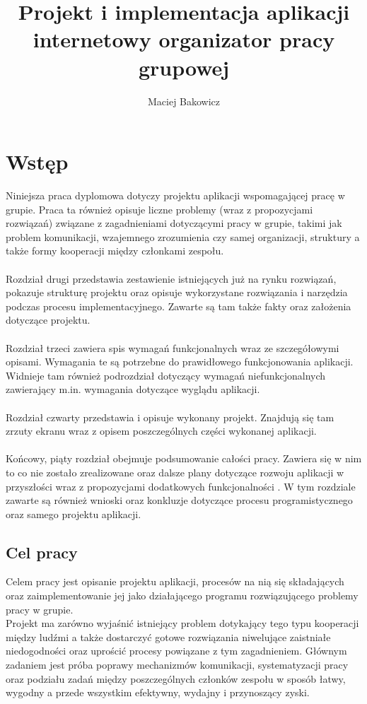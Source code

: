 \documentclass[eng,printmode]{mgr}
\title{Projekt i implementacja aplikacji internetowy organizator pracy grupowej }
\author{Maciej Bakowicz}
\begin{document}


\maketitle 

\tableofcontents 

\chapter{Wstęp}  
Niniejsza praca dyplomowa dotyczy projektu aplikacji wspomagającej pracę w grupie. Praca ta również opisuje liczne problemy (wraz z  propozycjami rozwiązań) związane z zagadnieniami dotyczącymi pracy w grupie, takimi jak problem komunikacji, wzajemnego zrozumienia czy samej organizacji, struktury a także formy kooperacji między członkami zespołu.
\\ \\
Rozdział drugi przedstawia zestawienie istniejących już na rynku rozwiązań, pokazuje strukturę projektu oraz opisuje wykorzystane rozwiązania i narzędzia podczas procesu implementacyjnego. Zawarte są tam także fakty oraz założenia dotyczące projektu.
\\ \\
Rozdział trzeci zawiera spis wymagań funkcjonalnych wraz ze szczegółowymi opisami. Wymagania te są potrzebne do prawidłowego funkcjonowania aplikacji. Widnieje tam również podrozdział dotyczący wymagań niefunkcjonalnych zawierający m.in. wymagania dotyczące wyglądu aplikacji.
\\ \\
Rozdział czwarty przedstawia i opisuje wykonany projekt. Znajdują się tam zrzuty ekranu wraz z opisem poszczególnych części wykonanej aplikacji.
\\ \\
Końcowy, piąty rozdział obejmuje podsumowanie całości pracy. Zawiera się w nim to co nie zostało zrealizowane oraz dalsze plany dotyczące rozwoju aplikacji w przyszłości wraz z propozycjami dodatkowych funkcjonalności . W tym rozdziale zawarte są również wnioski oraz konkluzje dotyczące procesu programistycznego oraz samego projektu aplikacji.

\section{Cel pracy}
Celem pracy jest opisanie projektu aplikacji, procesów na nią się składających oraz zaimplementowanie jej jako działającego programu rozwiązującego problemy pracy w grupie.
\\
Projekt ma zarówno wyjaśnić istniejący problem dotykający tego typu kooperacji między ludźmi a także dostarczyć gotowe rozwiązania niwelujące zaistniałe niedogodności oraz uprościć procesy powiązane z tym zagadnieniem. Głównym zadaniem jest próba poprawy mechanizmów komunikacji, systematyzacji pracy oraz podziału zadań między poszczególnych członków zespołu w sposób łatwy, wygodny a przede wszystkim efektywny, wydajny i przynoszący zyski.
\end{document}
